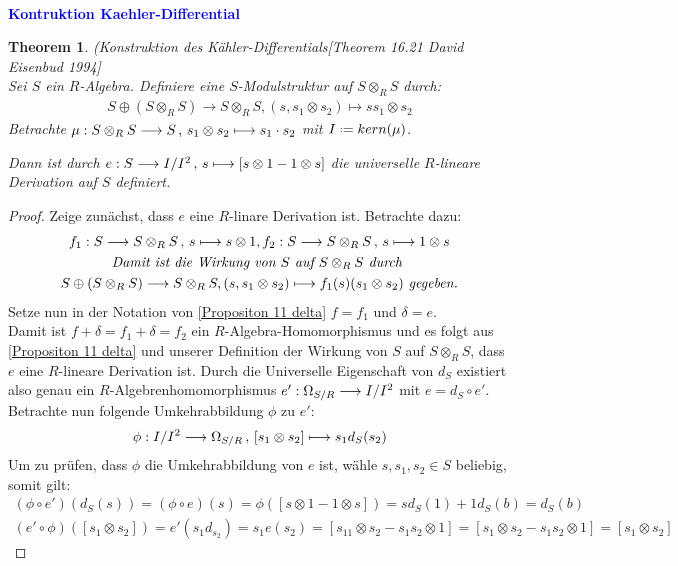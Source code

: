 \documentclass[10pt,a4paper]{report}
\newcommand{\comment}[1]{}
\newcommand{\ModulsOfDifferenzials}{David Eisenbud 1994}
\newcounter{Aussage}[chapter]
\newtheorem{theorem}[Aussage]{Theorem}
\newcommand{\functionfront}[3]{\nolinebreak{#1:#2 \longrightarrow #3}}
\newcommand{\function}[5]{\nolinebreak{#1:#2 \longrightarrow #3 \, , \, #4 \longmapsto #5}}
\newcommand{\divR}[2]{\Omega_{#1/#2}}
\newcommand{\divf}[1]{d_{#1}}
\newcommand{\Tensor}[3]{#1 \otimes_{#2} #3}
\newcommand{\tensor}[3]{#1 \otimes #3}
\newcommand*{\defeq}{\mathrel{\vcenter{\baselineskip0.5ex \lineskiplimit0pt
                     \hbox{\scriptsize.}\hbox{\scriptsize.}}}%
                     =}
\newcommand{\kernel}[1]{kern(#1)}
\begin{document}
\ \\
\textcolor{blue}{\textbf{Kontruktion Kaehler-Differential}}
\begin{theorem} (Konstruktion des Kähler-Differentials\comment{\label{Kontruktion Kaehler-Differential}}\textit{[Theorem 16.21 \ModulsOfDifferenzials]} \\
Sei $S$ ein $R$-Algebra. Definiere eine $S$-Modulstruktur auf $\Tensor{S}{R}{S}$ durch:
\begin{gather*}
S \oplus (\Tensor{S}{R}{S}) \longrightarrow \Tensor{S}{R}{S} ,(s,\tensor{s_1}{R}{s_2}) \longmapsto \tensor{ss_1}{R}{s_2}
\end{gather*}
Betrachte $\function{\mu}{\Tensor{S}{R}{S}}{S}{\tensor{s_1}{R}{s_2}}{s_1 \cdot s_2}$ mit $I \defeq \kernel{\mu}$.\\
\begin{center}
Dann ist durch $\function{e}{S}{I/I^2}{s}{[\tensor{s}{R}{1} - \tensor{1}{R}{s}]}$ die universelle $R$-lineare Derivation auf $S$ definiert.
\end{center}
\end{theorem}
\begin{proof}
Zeige zunächst, dass $e$ eine $R$-linare Derivation ist. Betrachte dazu:
\begin{gather*}
\function{f_1}{S}{\Tensor{S}{R}{S}}{s}{\tensor{s}{R}{1}} , \function{f_2}{S}{\Tensor{S}{R}{S}}{s}{\tensor{1}{R}{s}} \\
\textit{Damit ist die Wirkung von $S$ auf $\Tensor{S}{R}{S}$ durch }\\ S \oplus (\Tensor{S}{R}{S}) \longrightarrow \Tensor{S}{R}{S} ,(s,\tensor{s_1}{R}{s_2}) \longmapsto f_1(s)(\tensor{s_1}{R}{s_2}) \textit{ gegeben.}
\end{gather*}
Setze nun in der Notation von \cref{Propositon 11 delta} $f = f_1$ und $\delta = e$.\\
Damit ist $f + \delta = f_1 + \delta = f_2$ ein $R$-Algebra-Homomorphismus und es folgt aus \cref{Propositon 11 delta} und unserer Definition der Wirkung von $S$ auf $\Tensor{S}{R}{S}$, dass $e$ eine $R$-lineare Derivation ist. Durch die Universelle Eigenschaft von $\divf{S}$ existiert also genau ein $R$-Algebrenhomomorphismus $\functionfront{e'}{\divR{S}{R}}{I/I^2}$ mit $e = \divf{S} \circ e'$.\\
Betrachte nun folgende Umkehrabbildung $\phi$ zu $e'$:
\begin{gather*}
\function{\phi}{I/I^2}{\divR{S}{R}}{[\tensor{s_1}{R}{s_2}]}{s_1\divf{S}(s_2)}
\end{gather*}
Um zu prüfen, dass $\phi$ die Umkehrabbildung von $e$ ist, wähle $s,s_1,s_2 \in S$ beliebig, somit gilt:
\begin{gather*}
(\phi \circ e')(\divf{S}(s)) = (\phi \circ e)(s) = \phi([\tensor{s}{R}{1} - \tensor{1}{R}{s}]) = s\divf{S}(1) + 1\divf{S}(b) = \divf{S}(b) \\
(e' \circ \phi)([\tensor{s_1}{R}{s_2}]) = e'(s_1\divf{s_2}) = s_1 e(s_2) = [s_1\tensor{1}{R}{s_2} - s_1\tensor{s_2}{R}{1}] =
[\tensor{s_1}{R}{s_2} - \tensor{s_1s_2}{R}{1}] = [\tensor{s_1}{R}{s_2}]
\end{gather*}
\end{proof}
\end{document}
